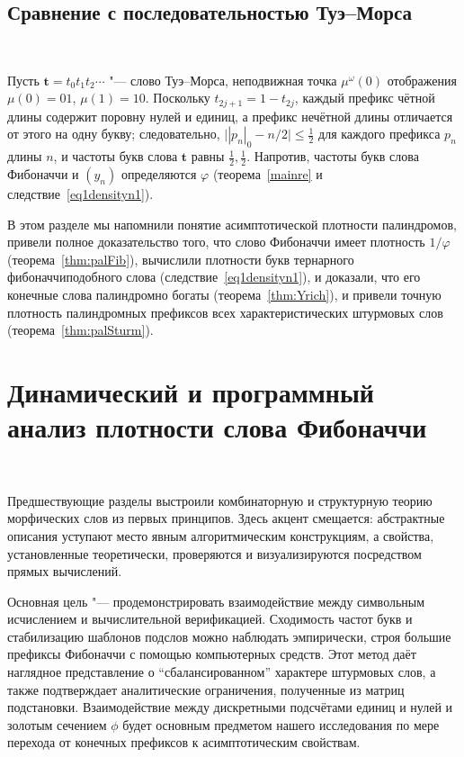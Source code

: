 \documentclass[a4paper,14pt]{extreport}
\theoremstyle{plain}
\theoremstyle{definition}
\theoremstyle{remark}
\begin{document}
\subsection{Сравнение с последовательностью Туэ--Морса}~\label{sec3.6.4}

Пусть $\mathbf t=t_0t_1t_2\cdots$ "--- слово Туэ--Морса, неподвижная точка $\mu^\omega(0)$ отображения $\mu(0)=01$, $\mu(1)=10$.
Поскольку $t_{2j+1}=1-t_{2j}$, каждый префикс чётной длины содержит поровну нулей и единиц, а префикс нечётной длины
отличается от этого на одну букву; следовательно, $\bigl||p_n|_0-n/2\bigr|\le\tfrac12$ для каждого префикса $p_n$ длины $n$, и частоты букв
слова $\mathbf t$ равны $\tfrac12,\tfrac12$. Напротив, частоты букв слова Фибоначчи и $(y_n)$
определяются $\varphi$ (теорема~\ref{mainre} и следствие~\ref{eq1densityn1}).

В этом разделе мы напомнили понятие асимптотической плотности палиндромов, привели полное доказательство того, что слово Фибоначчи имеет плотность
$1/\varphi$ (теорема~\ref{thm:palFib}), вычислили плотности букв тернарного фибоначчиподобного слова (следствие~\ref{eq1densityn1}), и доказали, что его конечные слова палиндромно богаты (теорема~\ref{thm:Yrich}), и привели точную плотность палиндромных префиксов всех характеристических штурмовых слов (теорема~\ref{thm:palSturm}).
\section{Динамический и программный анализ плотности слова Фибоначчи}~\label{sec3.7}

Предшествующие разделы выстроили комбинаторную и структурную теорию морфических слов из первых принципов. Здесь акцент смещается: абстрактные  описания уступают место явным алгоритмическим конструкциям, а свойства, установленные теоретически, проверяются и визуализируются посредством прямых вычислений.

Основная цель "--- продемонстрировать взаимодействие между символьным исчислением и вычислительной верификацией. Сходимость частот букв и стабилизацию шаблонов подслов можно наблюдать эмпирически, строя большие префиксы Фибоначчи с помощью компьютерных средств. Этот метод даёт наглядное представление о ``сбалансированном'' характере штурмовых слов, а также подтверждает аналитические ограничения, полученные из матриц подстановки. Взаимодействие между дискретными подсчётами единиц и нулей и золотым сечением $\phi$ будет основным предметом нашего исследования по мере перехода от конечных префиксов к асимптотическим свойствам.
\end{document}

